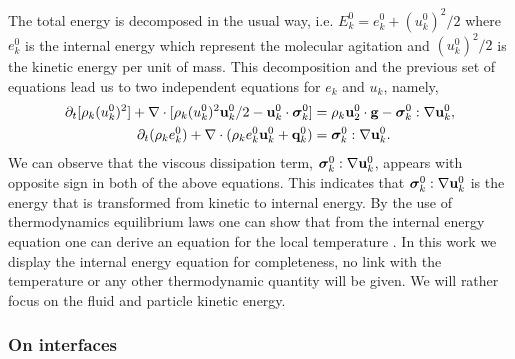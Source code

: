 The total energy is decomposed in the usual way, i.e. $E_k^0 = e_k^0 + (u_k^0)^2/2$ where  $e_k^0$ is the internal energy which represent the molecular agitation and $(u_k^0)^2/2$ is the kinetic energy per unit of mass.
This decomposition and the previous set of equations lead us to two independent equations for $e_k$ and $u_k$, namely,
\begin{align}
    \label{eq:dt_rhou_k2}
    \partial_t [\rho_k(u_k^0)^2]  
    + \mathbf{\nabla}\cdot [\rho_k(u_k^0)^2\textbf{u}_k^0/2 - \textbf{u}_k^0 \cdot \bm{\sigma}_k^0]
    &=
    \rho_k\textbf{u}_2^0 \cdot \textbf{g}  
    -  \bm{\sigma}_k^0 : \mathbf{\nabla} \textbf{u}_k^0,
    \\
    \label{eq:dt_rhoe_k}
    \partial_t (\rho_ke_k^0)  
    + \mathbf{\nabla}\cdot (
        \rho_ke_k^0\textbf{u}_k^0
        + \textbf{q}_k^0
        )
    &= 
    \bm{\sigma}_k^0 : \mathbf{\nabla} \textbf{u}_k^0. 
\end{align} 
We can observe that the viscous dissipation term, $\bm{\sigma}_k^0 : \mathbf{\nabla} \textbf{u}_k^0$,  appears with opposite sign in both of the above equations.
This indicates that $\bm{\sigma}_k^0 : \mathbf{\nabla} \textbf{u}_k^0$ is the energy that is transformed from kinetic to internal energy. 
By the use of thermodynamics equilibrium laws one can show that from the internal energy equation one can derive an equation for the local temperature \citet{ishii2010thermo}.
In this work we display the internal energy equation for completeness, no link with the temperature or any other thermodynamic quantity will be given. 
We will rather focus on the fluid and particle kinetic energy. 

\subsubsection{On interfaces}

